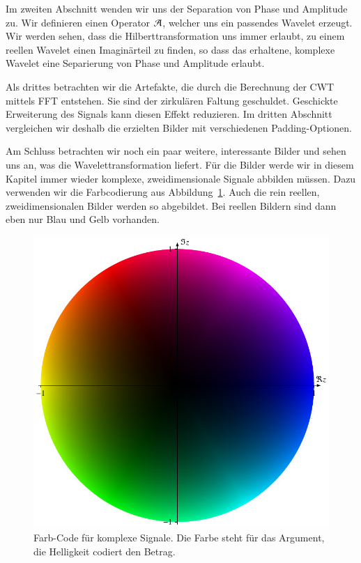 \begin{refsection}
Im zweiten Abschnitt wenden wir uns der Separation von Phase und Amplitude zu.
Wir definieren einen Operator $\Ana\,$, welcher uns ein passendes Wavelet erzeugt.
Wir werden sehen, dass die Hilberttransformation uns immer erlaubt, zu einem reellen Wavelet einen Imaginärteil zu finden,
so dass das erhaltene, komplexe Wavelet eine Separierung von Phase und Amplitude erlaubt.

Als drittes betrachten wir die Artefakte, die durch die Berechnung der CWT mittels FFT entstehen.
Sie sind der zirkulären Faltung geschuldet.
Geschickte Erweiterung des Signals kann diesen Effekt reduzieren.
Im dritten Abschnitt vergleichen wir deshalb die erzielten Bilder mit verschiedenen Padding-Optionen.

Am Schluss betrachten wir noch ein paar weitere, interessante Bilder und sehen uns an, was die Wavelettransformation liefert.
Für die Bilder werde wir in diesem Kapitel immer wieder komplexe, zweidimensionale Signale abbilden müssen.
Dazu verwenden wir die Farbcodierung aus Abbildung~\ref{complex:color-code}.
Auch die rein reellen, zweidimensionalen Bilder werden so abgebildet.
Bei reellen Bildern sind dann eben nur Blau und Gelb vorhanden.

\begin{figure}
	\centering
	\includegraphics{papers/complex/images/colors.pdf}
	\caption{Farb-Code für komplexe Signale. Die Farbe steht für das Argument, die Helligkeit codiert den Betrag.}
	\label{complex:color-code}
\end{figure}


\end{refsection}
